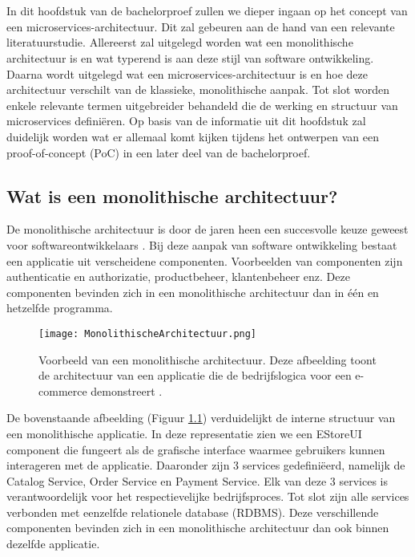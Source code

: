 \chapter{}%
\label{ch:stand-van-zaken}

In dit hoofdstuk van de bachelorproef zullen we dieper ingaan op het concept van een microservices-architectuur. Dit zal gebeuren aan de hand van een relevante literatuurstudie. Allereerst zal uitgelegd worden wat een monolithische architectuur is en wat typerend is aan deze stijl van software ontwikkeling. Daarna wordt uitgelegd wat een microservices-architectuur is en hoe deze architectuur verschilt van de klassieke, monolithische aanpak. Tot slot worden enkele relevante termen uitgebreider behandeld die de werking en structuur van microservices definiëren. Op basis van de informatie uit dit hoofdstuk zal duidelijk worden wat er allemaal komt kijken tijdens het ontwerpen van een proof-of-concept (PoC) in een later deel van de bachelorproef.

\section{Wat is een monolithische architectuur?}

De monolithische architectuur is door de jaren heen een succesvolle keuze geweest voor softwareontwikkelaars \autocite{Gos2020}. Bij deze aanpak van software ontwikkeling bestaat een applicatie uit verscheidene componenten. Voorbeelden van componenten zijn authenticatie en authorizatie, productbeheer, klantenbeheer enz. Deze componenten bevinden zich in een monolithische architectuur dan in één en hetzelfde programma.

\begin{figure}[H]
  \centering
  \texttt{[image: MonolithischeArchitectuur.png]}
  \caption[Voorstelling van een monolitische architectuur]{\label{fig:monolithische architectuur}Voorbeeld van een monolithische architectuur. Deze afbeelding toont de architectuur van een applicatie die de bedrijfslogica voor een e-commerce demonstreert \autocite{Gos2020}.}
\end{figure}

De bovenstaande afbeelding (Figuur \ref{fig:monolithische architectuur}) verduidelijkt de interne structuur van een monolithische applicatie. In deze representatie zien we een EStoreUI component die fungeert als de grafische interface waarmee gebruikers kunnen interageren met de applicatie. Daaronder zijn 3 services gedefiniëerd, namelijk de Catalog Service, Order Service en Payment Service. Elk van deze 3 services is verantwoordelijk voor het respectievelijke bedrijfsproces. Tot slot zijn alle services verbonden met eenzelfde relationele database (RDBMS). Deze verschillende componenten bevinden zich in een monolithische architectuur dan ook binnen dezelfde applicatie.\newline

